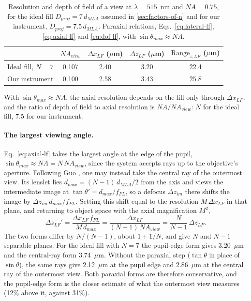 \begin{table}[tbp]
    \centering
    \caption{Resolution and depth of field of a view at $\lambda=515$~nm and $NA=0.75$, for the ideal fill $D_{proj}=7\,d_{MLA}$ assumed in \cref{sec:factors-of-n} and for our instrument, $D_{proj}=7.5\,d_{MLA}$. Paraxial relations, Eqs.~\eqref{eq:lateral-lf}, \eqref{eq:axial-lf} and \eqref{eq:dof-lf}, with $\sin\theta_{max}\approx NA$.}
    \label{tab:app-ideal-fill}
    \begin{tabular}{@{}lcccc@{}}
        \toprule
        & $NA_{view}$ & $\Delta x_{LF}$ ($\mu$m) & $\Delta z_{LF}$ ($\mu$m) & $\mathrm{Range}_{z,LF}$ ($\mu$m) \\
        \midrule
        Ideal fill, $N=7$ & 0.107 & 2.40 & 3.20 & 22.4 \\
        Our instrument & 0.100 & 2.58 & 3.43 & 25.8 \\
        \bottomrule
    \end{tabular}
\end{table}

With $\sin\theta_{max}\approx NA$, the axial resolution depends on the fill only through $\Delta x_{LF}$, and the ratio of depth of field to axial resolution is $NA/NA_{view}$: $N$ for the ideal fill, 7.5 for our instrument.

\paragraph{The largest viewing angle.} Eq.~\eqref{eq:axial-lf} takes the largest angle at the edge of the pupil, $\sin\theta_{max}\approx NA=N\,NA_{view}$, since the system accepts rays up to the objective's aperture. Following Guo \cite{guo2019fourierLightField}, one may instead take the central ray of the outermost view. Its lenslet lies $d_{max}=(N-1)\,d_{MLA}/2$ from the axis and views the intermediate image at $\tan\theta'=d_{max}/f_{FL}$, so a defocus $\Delta z_{im}$ there shifts the image by $\Delta z_{im}\,d_{max}/f_{FL}$. Setting this shift equal to the resolution $M\,\Delta x_{LF}$ in that plane, and returning to object space with the axial magnification $M^2$,
\begin{equation}
    \Delta z_{LF}' = \frac{\Delta x_{LF}\,f_{FL}}{M\,d_{max}}
    = \frac{\Delta x_{LF}}{(N-1)\,NA_{view}}
    = \frac{N}{N-1}\,\Delta z_{LF}.
    \label{eq:app-axial-dmax}
\end{equation}
The two forms differ by $N/(N-1)$, about $1+1/N$, and give $N$ and $N-1$ separable planes. For the ideal fill with $N=7$ the pupil-edge form gives 3.20~$\mu$m and the central-ray form 3.74~$\mu$m. Without the paraxial step ($\tan\theta$ in place of $\sin\theta$), the same rays give 2.12~$\mu$m at the pupil edge and 2.86~$\mu$m at the central ray of the outermost view. Both paraxial forms are therefore conservative, and the pupil-edge form is the closer estimate of what the outermost view measures (12\% above it, against 31\%).

